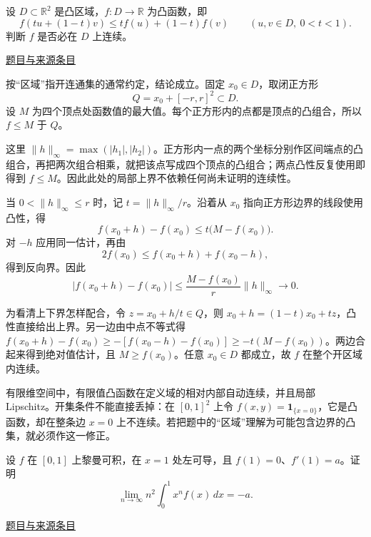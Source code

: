 \documentclass[12pt,fontset=fandol]{ctexart}
\begin{document}
\begin{example}[来源序号3]\label{ex:pre02-math:3}\label{pr:pre02-math:3}

设 $D\subset\mathbb R^2$ 是凸区域，$f:D\to\mathbb R$ 为凸函数，即
\[
f(tu+(1-t)v)\le tf(u)+(1-t)f(v)
\qquad(u,v\in D,\ 0<t<1).
\]
判断 $f$ 是否必在 $D$ 上连续。

\par\href{https://github.com/lzxcr/cmc-mathematics/blob/64916fa1fdbc3e444a652eca204d5669058ee321/src/problems/preliminary/02/03.md}{题目与来源条目}

\end{example}

\begin{solve}\label{ans:pre02-math:3}

按“区域”指开连通集的通常约定，结论成立。固定 $x_0\in D$，取闭正方形
\[
Q=x_0+[-r,r]^2\subset D.
\]
设 $M$ 为四个顶点处函数值的最大值。每个正方形内的点都是顶点的凸组合，所以 $f\le M$ 于 $Q$。

这里 $\|h\|_\infty=\max(|h_1|,|h_2|)$。正方形内一点的两个坐标分别作区间端点的凸组合，再把两次组合相乘，就把该点写成四个顶点的凸组合；两点凸性反复使用即得到 $f\le M$。因此此处的局部上界不依赖任何尚未证明的连续性。

当 $0<\|h\|_\infty\le r$ 时，记 $t=\|h\|_\infty/r$。沿着从 $x_0$ 指向正方形边界的线段使用凸性，得
\[
f(x_0+h)-f(x_0)\le t\bigl(M-f(x_0)\bigr).
\]
对 $-h$ 应用同一估计，再由
\[
2f(x_0)\le f(x_0+h)+f(x_0-h),
\]
得到反向界。因此
\[
|f(x_0+h)-f(x_0)|
\le\frac{M-f(x_0)}r\|h\|_\infty\longrightarrow0.
\]

为看清上下界怎样配合，令 $z=x_0+h/t\in Q$，则 $x_0+h=(1-t)x_0+tz$，凸性直接给出上界。另一边由中点不等式得 $f(x_0+h)-f(x_0)\ge-[f(x_0-h)-f(x_0)]\ge-t(M-f(x_0))$。两边合起来得到绝对值估计，且 $M\ge f(x_0)$。任意 $x_0\in D$ 都成立，故 $f$ 在整个开区域内连续。

\end{solve}

\begin{remark}[方法与条件]有限维空间中，有限值凸函数在定义域的相对内部自动连续，并且局部 Lipschitz。开集条件不能直接丢掉：在 $[0,1]^2$ 上令 $f(x,y)=\mathbf1_{\{x=0\}}$，它是凸函数，却在整条边 $x=0$ 上不连续。若把题中的“区域”理解为可能包含边界的凸集，就必须作这一修正。\end{remark}

\begin{example}[来源序号4]\label{ex:pre02-math:4}\label{pr:pre02-math:4}

设 $f$ 在 $[0,1]$ 上黎曼可积，在 $x=1$ 处左可导，且 $f(1)=0$、$f'(1)=a$。证明
\[
\lim_{n\to\infty}n^2\int_0^1x^nf(x)\,dx=-a.
\]

\par\href{https://github.com/lzxcr/cmc-mathematics/blob/64916fa1fdbc3e444a652eca204d5669058ee321/src/problems/preliminary/02/04.md}{题目与来源条目}

\end{example}
\end{document}
